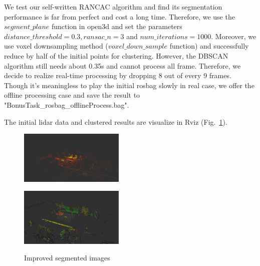 \documentclass[10pt]{article}
\theoremstyle{nonumberplain}
\begin{document}
We test our self-written RANCAC algorithm and find its segmentation performance is far from perfect and cost a long time. Therefore, we use the $segment\_plane$ function in open3d and set the parameters $distance\_threshold=0.3, ransac\_n=3$ and $num\_iterations=1000$. Moreover, we use voxel downsampling method ($voxel\_down\_sample$ function) and successfully reduce by half of the initial points for clustering. However, the DBSCAN algorithm still needs about 0.35s and cannot process all frame. Therefore, we decide to realize real-time processing by dropping 8 out of every 9 frames. Though it's meaningless to play the initial rosbag slowly in real case, we offer the offline processing case and save the result to "BonusTask\_rosbag\_offlineProcess.bag".

The initial lidar data and clustered results are visualize in Rviz (Fig.~\ref{fig8}).


\begin{figure}[H]
	\centering
	\begin{minipage}[t]{0.4\textwidth}
		\centering
		\includegraphics[width=5cm]{fig8b.png}
		\label{fig8a}
	\end{minipage}
	\begin{minipage}[t]{0.4\textwidth}
		\centering
		\includegraphics[width=5cm]{fig8a.png}
		\label{fig8b}
	\end{minipage}
	\caption{Improved segmented images}
	\label{fig8}
\end{figure}











	
\end{document}
